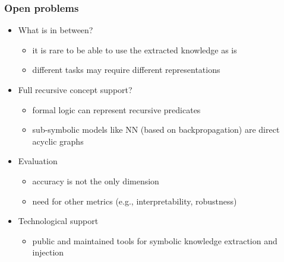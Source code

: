 \documentclass[presentation]{beamer}\mode<presentation>{\usetheme{blackAMSBolognaFC}}
\begin{document}
\begin{frame}%
\frametitle{Open problems}

    \begin{itemize}
        \item What is in between?
        \begin{itemize}
            \item it is rare to be able to use the extracted knowledge as is
            \item different tasks may require different representations
        \end{itemize}

        \vfill

        \item Full recursive concept support?
        \begin{itemize}
            \item formal logic can represent recursive predicates
            \item sub-symbolic models like NN (based on \alert{backpropagation}) are direct acyclic graphs
        \end{itemize}

        \vfill

        \item Evaluation
        \begin{itemize}
            \item accuracy is not the only dimension
            \item need for other metrics (e.g., interpretability, robustness)~
        \end{itemize}

        \vfill

        \item Technological support
        \begin{itemize}
            \item \alert{public} and \alert{maintained} tools for symbolic knowledge extraction and injection~
        \end{itemize}

    \end{itemize}

\end{frame}
\end{document}
